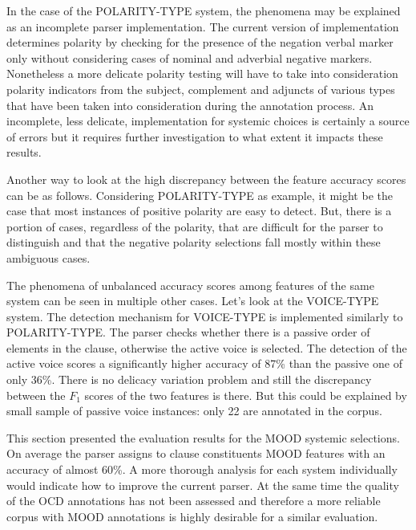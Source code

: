     In the case of the POLARITY-TYPE system, the phenomena may be explained as an incomplete parser implementation. The current version of implementation determines polarity by checking for the presence of the negation verbal marker only without considering cases of nominal and adverbial negative markers. Nonetheless a more delicate polarity testing will have to take into consideration polarity indicators from the subject, complement and adjuncts of various types that have been taken into consideration during the annotation process. An incomplete, less delicate, implementation for systemic choices is certainly a source of errors but it requires further investigation to what extent it impacts these results. %
    
    Another way to look at the high discrepancy between the feature accuracy scores can be as follows. Considering POLARITY-TYPE as example, it might be the case that most instances of positive polarity are easy to detect. But, there is a portion of cases, regardless of the polarity, that are difficult for the parser to distinguish and that the negative polarity selections fall mostly within these ambiguous cases. %
    
    The phenomena of unbalanced accuracy scores among features of the same system can be seen in multiple other cases. Let's look at the VOICE-TYPE system. The detection mechanism for VOICE-TYPE is implemented similarly to POLARITY-TYPE. The parser checks whether there is a passive order of elements in the clause, otherwise the active voice is selected.
    The detection of the active voice scores a significantly higher accuracy of 87\% than the passive one of only 36\%. There is no delicacy variation problem and still the discrepancy between the $F_1$ scores of the two features is there. But this could be explained by small sample of passive voice instances: only 22 are annotated in the corpus. 

    This section presented the evaluation results for the MOOD systemic selections. On average the parser assigns to clause constituents MOOD features with an accuracy of almost 60\%. A more thorough analysis for each system individually would indicate how to improve the current parser. At the same time the quality of the OCD annotations has not been assessed and therefore a more reliable corpus with MOOD annotations is highly desirable for a similar evaluation. %

